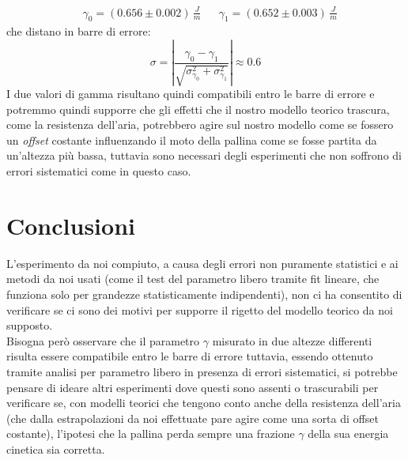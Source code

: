 \documentclass{article}
\begin{document}
\begin{align*}
	&\gamma_0 = (0.656 \pm 0.002) \, \unit{\frac{J}{m}} & &\gamma_1 = (0.652 \pm 0.003) \, \unit{\frac{J}{m}}
\end{align*}
che distano in barre di errore:
$$
	\sigma = \left| \frac{\gamma_0 - \gamma_1}{\sqrt{\sigma^2_{\gamma_0} + \sigma^2_{\gamma_1}}} \right| \approx 0.6
$$
I due valori di gamma risultano quindi compatibili entro le barre di errore e potremmo quindi supporre che gli effetti che il nostro modello teorico trascura, come la resistenza dell'aria, potrebbero agire sul nostro modello come se fossero un \emph{offset} costante influenzando il moto della pallina come se fosse partita da un'altezza più bassa, tuttavia sono necessari degli esperimenti che non soffrono di errori sistematici come in questo caso.

\section{Conclusioni}

L'esperimento da noi compiuto, a causa degli errori non puramente statistici e ai metodi da noi usati (come il test del parametro libero tramite fit lineare, che funziona solo per grandezze statisticamente indipendenti), non ci ha consentito di verificare se ci sono dei motivi per supporre il rigetto del modello teorico da noi supposto. \\
Bisogna però osservare che il parametro $\gamma$ misurato in due altezze differenti risulta essere compatibile entro le barre di errore tuttavia, essendo ottenuto tramite analisi per parametro libero in presenza di errori sistematici, si potrebbe pensare di ideare altri esperimenti dove questi sono assenti o trascurabili per verificare se, con modelli teorici che tengono conto anche della resistenza dell'aria (che dalla estrapolazioni da noi effettuate pare agire come una sorta di offset costante), l'ipotesi che la pallina perda sempre una frazione $\gamma$ della sua energia cinetica sia corretta. 
\end{document}
